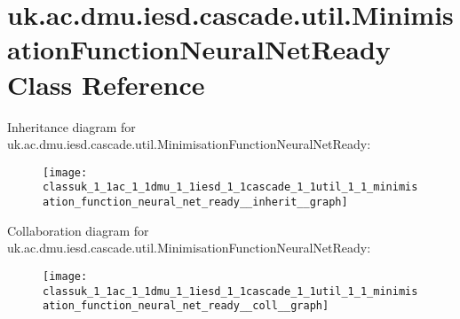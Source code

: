 \hypertarget{classuk_1_1ac_1_1dmu_1_1iesd_1_1cascade_1_1util_1_1_minimisation_function_neural_net_ready}{\section{uk.\-ac.\-dmu.\-iesd.\-cascade.\-util.\-Minimisation\-Function\-Neural\-Net\-Ready Class Reference}
\label{classuk_1_1ac_1_1dmu_1_1iesd_1_1cascade_1_1util_1_1_minimisation_function_neural_net_ready}
}


Inheritance diagram for uk.\-ac.\-dmu.\-iesd.\-cascade.\-util.\-Minimisation\-Function\-Neural\-Net\-Ready\-:\nopagebreak
\begin{figure}[H]
\begin{center}
\leavevmode
\texttt{[image: classuk\_1\_1ac\_1\_1dmu\_1\_1iesd\_1\_1cascade\_1\_1util\_1\_1\_minimisation\_function\_neural\_net\_ready\_\_inherit\_\_graph]}
\end{center}
\end{figure}


Collaboration diagram for uk.\-ac.\-dmu.\-iesd.\-cascade.\-util.\-Minimisation\-Function\-Neural\-Net\-Ready\-:\nopagebreak
\begin{figure}[H]
\begin{center}
\leavevmode
\texttt{[image: classuk\_1\_1ac\_1\_1dmu\_1\_1iesd\_1\_1cascade\_1\_1util\_1\_1\_minimisation\_function\_neural\_net\_ready\_\_coll\_\_graph]}
\end{center}
\end{figure}
